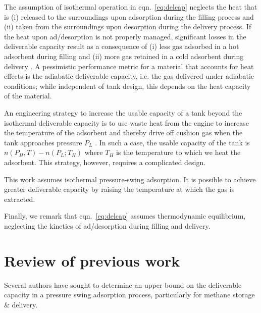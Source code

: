\documentclass{nature}
\begin{document}
The assumption of isothermal operation in eqn.~\ref{eq:delcap} neglects the heat that is (i) released to the surroundings upon adsorption during the filling process and (ii) taken from the surroundings upon desorption during the delivery process. If the heat upon ad/desorption is not properly managed, significant losses in the deliverable capacity result as a consequence of (i) less gas adsorbed in a hot adsorbent during filling and (ii) more gas retained in a cold adsorbent during delivery \cite{mota1997dynamics,chang1996behavior}. A pessimistic performance metric for a material that accounts for heat effects is the adiabatic deliverable capacity, i.e. the gas delivered under adiabatic conditions; while independent of tank design, this depends on the heat capacity of the material.

An engineering strategy to increase the usable capacity of a tank beyond the isothermal deliverable capacity is to use waste heat from the engine to increase the temperature of the adsorbent and thereby drive off cushion gas when the tank approaches pressure $P_L$ \cite{gomez2014exploring}. In such a case, the usable capacity of the tank is $n(P_H, T)-n(P_L; T_H)$ where $T_H$ is the temperature to which we heat the adsorbent. This strategy, however, requires a complicated design.

\begin{limitation}\label{limit:isothermal}
This work assumes isothermal pressure-swing adsorption.  It is possible to achieve greater deliverable capacity by raising the temperature at which the gas is extracted.
\end{limitation}

Finally, we remark that eqn.~\ref{eq:delcap} assumes thermodynamic equilibrium, neglecting the kinetics of ad/desorption during filling and delivery.

\section{Review of previous work}
Several authors have sought to determine an upper bound on the deliverable capacity in a pressure swing adsorption process, particularly for methane storage \& delivery.
\end{document}
